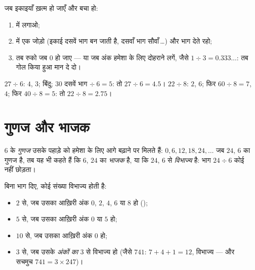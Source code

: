 \begin{method}[भाग को बिंदु के आगे बढ़ाना]\label{met:g5:division:continue}
जब इकाइयाँ ख़त्म हो जाएँ और  बचा हो:
\begin{enumerate}
  \item {} में  लगाओ;
  \item {} में एक  जोड़ो (इकाई दसवें भाग बन जाती है,
        दसवाँ भाग सौवाँ\,\dots) और भाग देते रहो;
  \item तब रुको जब  $0$ हो जाए --- या जब अंक हमेशा के लिए
        दोहराने लगें, जैसे $1 \div 3 = 0.333\dots$: तब गोल किया
        हुआ मान दे दो।
\end{enumerate}
\end{method}

\begin{example}\label{ex:g5:division:continue}
$27 \div 6$:  $4$,  $3$; बिंदु; $30$ दसवें भाग
$\div\ 6 = 5$: तो $27 \div 6 = 4.5$। \quad
$22 \div 8$: $2$,  $6$; फिर $60 \div 8 = 7$,  $4$;
फिर $40 \div 8 = 5$: तो $22 \div 8 = 2.75$।
\end{example}

\section{गुणज और भाजक}

\begin{definition}[गुणज, भाजक]\label{def:g5:division:multiple}
$6$ के \emph{गुणज} उसके पहाड़े को हमेशा के लिए आगे
बढ़ाने पर मिलते हैं: $0, 6, 12, 18, 24, \dots$ जब $24$, $6$ का
गुणज है, तब यह भी कहते हैं कि $6$, $24$ का \emph{भाजक} है,
या कि $24$, $6$ से \emph{विभाज्य} है: भाग $24 \div 6$ कोई
 नहीं छोड़ता।
\end{definition}

\begin{proposition}[विभाज्यता की तरकीबें]\label{prop:g5:division:criteria}
बिना भाग दिए, कोई संख्या विभाज्य होती है:
\begin{itemize}
  \item $2$ से, जब उसका आख़िरी अंक $0$, $2$, $4$, $6$ या $8$ हो
        ();
  \item $5$ से, जब उसका आख़िरी अंक $0$ या $5$ हो;
  \item $10$ से, जब उसका आख़िरी अंक $0$ हो;
  \item $3$ से, जब उसके \emph{अंकों का } $3$ से विभाज्य हो
        (जैसे $741$: $7 + 4 + 1 = 12$, विभाज्य --- और सचमुच
        $741 = 3 \times 247$)।
\end{itemize}
\end{proposition}
\admitted

